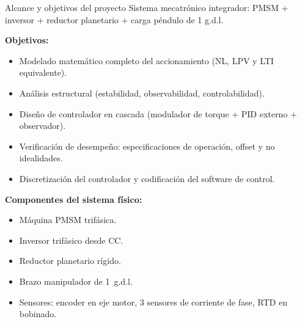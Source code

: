 \documentclass[aspectratio=169,t]{beamer}
\begin{document}
\begin{frame}{Alcance y objetivos del proyecto}
  {\small\color{uncGray}Sistema mecatrónico integrador: PMSM + inversor + reductor planetario + carga péndulo de 1 g.d.l.}\par
  \vspace{4mm}

  \textbf{Objetivos:}
  \begin{itemize}
    \item Modelado matemático completo del accionamiento (NL, LPV y LTI equivalente).
    \item Análisis estructural (estabilidad, observabilidad, controlabilidad).
    \item Diseño de controlador en cascada (modulador de torque + PID externo + observador).
    \item Verificación de desempeño: especificaciones de operación, offset y no idealidades.
    \item Discretización del controlador y codificación del software de control.
  \end{itemize}

  \vspace{3mm}
  \textbf{Componentes del sistema físico:}
  \begin{itemize}
    \item Máquina PMSM trifásica.
    \item Inversor trifásico desde CC.
    \item Reductor planetario rígido.
    \item Brazo manipulador de 1~g.d.l.
    \item Sensores: encoder en eje motor, 3 sensores de corriente de fase, RTD en bobinado.
  \end{itemize}
\end{frame}
\end{document}
